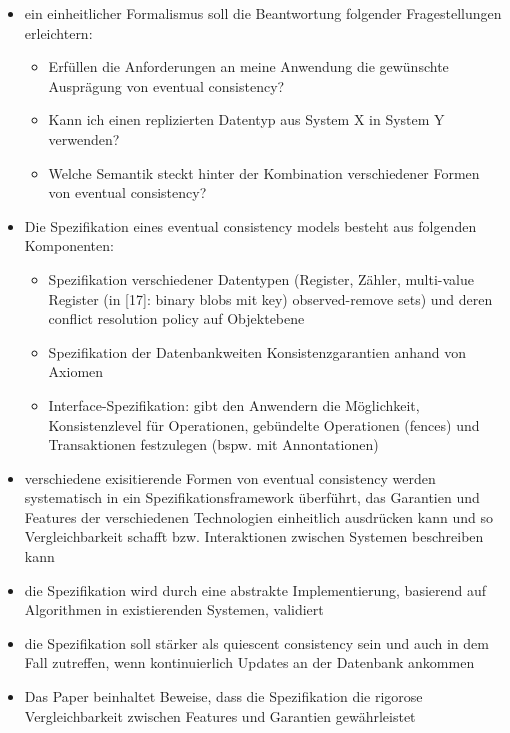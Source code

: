 \documentclass[11pt,a4paper,ngerman]{scrartcl}
\begin{document}
\begin{itemize}
\begin{itemize}
\end{itemize}
\item ein einheitlicher Formalismus soll die Beantwortung folgender Fragestellungen erleichtern:
\begin{itemize}
\item Erfüllen die Anforderungen an meine Anwendung die gewünschte Ausprägung von \gls{eventual consistency}?
\item Kann ich einen replizierten Datentyp aus System X in System Y verwenden?
\item Welche Semantik steckt hinter der Kombination verschiedener Formen von \gls{eventual consistency}?
\end{itemize}
\item Die Spezifikation eines \gls{eventual consistency} models besteht aus folgenden Komponenten:
\begin{itemize}
\item Spezifikation verschiedener Datentypen (Register, Zähler, multi-value Register (in [17]: binary blobs mit key) observed-remove sets) und deren conflict resolution policy auf Objektebene
\item Spezifikation der Datenbankweiten Konsistenzgarantien anhand von Axiomen
\item Interface-Spezifikation: gibt den Anwendern die Möglichkeit, Konsistenzlevel für Operationen, gebündelte Operationen (fences) und Transaktionen festzulegen (bspw. mit Annontationen) 
\end{itemize}
\item verschiedene exisitierende Formen von \gls{eventual consistency} werden systematisch in ein Spezifikationsframework überführt, das Garantien und Features der verschiedenen Technologien einheitlich ausdrücken kann und so Vergleichbarkeit schafft bzw. Interaktionen zwischen Systemen beschreiben kann
\item die Spezifikation wird durch eine abstrakte Implementierung, basierend auf Algorithmen in existierenden Systemen, validiert
\item die Spezifikation soll stärker als \gls{quiescent consistency} sein und auch in dem Fall zutreffen, wenn kontinuierlich Updates an der Datenbank ankommen
\item Das Paper beinhaltet Beweise, dass die Spezifikation die rigorose Vergleichbarkeit zwischen Features und Garantien gewährleistet
\end{itemize}

\pagebreak
\printglossaries
\end{document}
